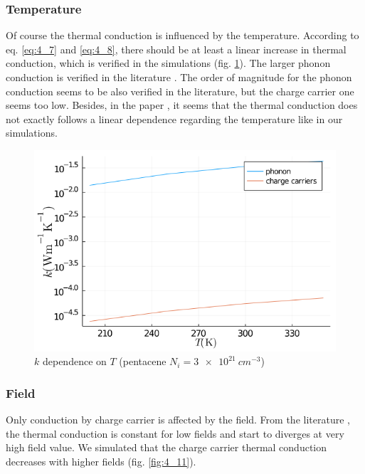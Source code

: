 \subsubsection{Temperature}

Of course the thermal conduction is influenced by the temperature. According to eq. \ref{eq:4_7} and \ref{eq:4_8}, there should be at least a linear increase in thermal conduction, which is verified in the simulations (fig. \ref{fig:4_10}). The larger phonon conduction is verified in the literature \cite{universal_einstein}. The order of magnitude for the phonon conduction seems to be also verified in the literature, but the charge carrier one seems too low. Besides, in the paper \cite{universal_einstein}, it seems that the thermal conduction does not exactly follows a linear dependence regarding the temperature like in our simulations.

\begin{figure}[!h]
    \centering
    \includegraphics*[width=.5\paperwidth]{figures/4_thermal/k_temperature.png}
    \caption{$k$ dependence on $T$ (pentacene $N_i = \SI{3e21}{cm^{-3}}$)\label{fig:4_10}}
\end{figure}

\subsubsection{Field}

Only conduction by charge carrier is affected by the field. From the literature \cite{universal_einstein}, the thermal conduction is constant for low fields and start to diverges at very high field value. We simulated that the charge carrier thermal conduction decreases with higher fields (fig. \ref{fig:4_11}).

